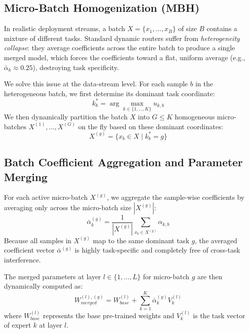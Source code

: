 \subsection{Micro-Batch Homogenization (MBH)}
In realistic deployment streams, a batch $X = \{x_1, \dots, x_B\}$ of size $B$ contains a mixture of different tasks. Standard dynamic routers suffer from \emph{heterogeneity collapse}: they average coefficients across the entire batch to produce a single merged model, which forces the coefficients toward a flat, uniform average (e.g., $\bar{\alpha}_k \approx 0.25$), destroying task specificity.

We solve this issue at the data-stream level. For each sample $b$ in the heterogeneous batch, we first determine its dominant task coordinate:
\begin{equation}
k_b^* = \arg\max_{k \in \{1, \dots, K\}} u_{k, b}
\label{eq:dominant_task}
\end{equation}
We then dynamically partition the batch $X$ into $G \le K$ homogeneous micro-batches $X^{(1)}, \dots, X^{(G)}$ on the fly based on these dominant coordinates:
\begin{equation}
X^{(g)} = \{x_b \in X \mid k_b^* = g\}
\label{eq:microbatch}
\end{equation}

\subsection{Batch Coefficient Aggregation and Parameter Merging}
For each active micro-batch $X^{(g)}$, we aggregate the sample-wise coefficients by averaging only across the micro-batch size $|X^{(g)}|$:
\begin{equation}
\bar{\alpha}_k^{(g)} = \frac{1}{|X^{(g)}|} \sum_{x_b \in X^{(g)}} \alpha_{k, b}
\label{eq:aggregate_coef}
\end{equation}
Because all samples in $X^{(g)}$ map to the same dominant task $g$, the averaged coefficient vector $\bar{\alpha}^{(g)}$ is highly task-specific and completely free of cross-task interference.

The merged parameters at layer $l \in \{1, \dots, L\}$ for micro-batch $g$ are then dynamically computed as:
\begin{equation}
W_{merged}^{(l), (g)} = W_{base}^{(l)} + \sum_{k=1}^K \bar{\alpha}_k^{(g)} V_k^{(l)}
\label{eq:weight_merge}
\end{equation}
where $W_{base}^{(l)}$ represents the base pre-trained weights and $V_k^{(l)}$ is the task vector of expert $k$ at layer $l$.


